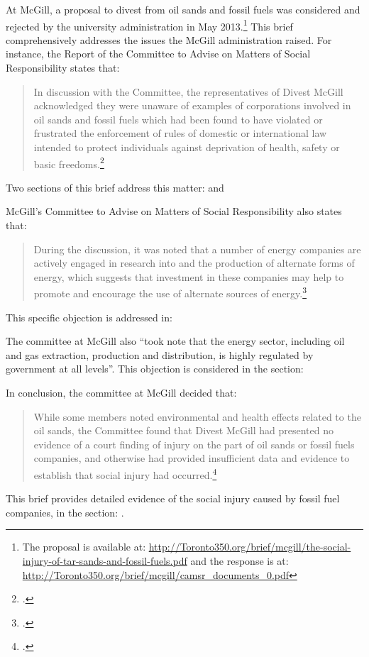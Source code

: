 \documentclass[10pt]{article}
\begin{document}
At McGill, a proposal to divest from oil sands and fossil fuels was considered and rejected by the university administration in May 2013.\footnote{The proposal is available at: \url{http://Toronto350.org/brief/mcgill/the-social-injury-of-tar-sands-and-fossil-fuels.pdf} and the response is at: \url{http://Toronto350.org/brief/mcgill/camsr_documents_0.pdf}}
This brief comprehensively addresses the issues the McGill administration raised.
For instance, the Report of the Committee to Advise on Matters of Social Responsibility states that:
\begin{quote}
In discussion with the Committee, the representatives of Divest McGill acknowledged they were unaware of examples of corporations involved in oil sands and fossil fuels which had been found to have violated or frustrated the enforcement of rules of domestic or international law intended to protect individuals against deprivation of health, safety or basic freedoms.\footcite[][p. 4]{McGillRejection}
\end{quote}
Two sections of this brief address this matter:  and 



McGill's Committee to Advise on Matters of Social Responsibility also states that:
\begin{quote}
During the discussion, it was noted that a number of energy companies are actively engaged in research into and the production of alternate forms of energy, which suggests that investment in these companies may help to promote and encourage the use of alternate sources of energy.\footcite[][p. 4]{McGillRejection}
\end{quote}
This specific objection is addressed in: 



The committee at McGill also ``took note that the energy sector, including oil and gas extraction, production and distribution, is highly regulated by government at all levels''. This objection is considered in the section: 



In conclusion, the committee at McGill decided that:
\begin{quote}
While some members noted environmental and health effects related to the oil sands, the Committee found that Divest McGill had presented no evidence of a court finding of injury on the part of oil sands or fossil fuels companies, and otherwise had provided insufficient data and evidence to establish that social injury had occurred.\footcite[][p. 4]{McGillRejection}
\end{quote}
This brief provides detailed evidence of the social injury caused by fossil fuel companies, in the section: .
\end{document}
